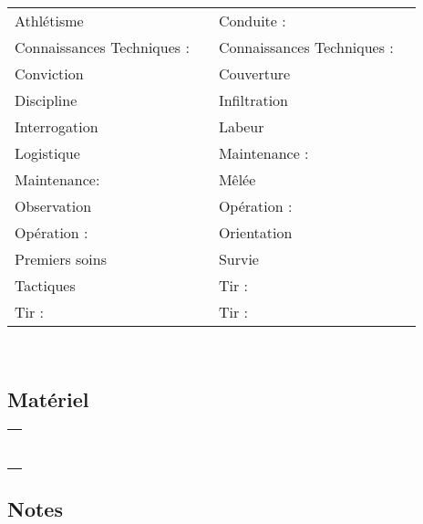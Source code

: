 \documentclass{report}
\begin{document}
\begin{tabular}{p{}| r || p{}| r|}
Athlétisme & &Conduite : & {}\\
Connaissances Techniques : &  &Connaissances Techniques : & {}\\
Conviction &  &Couverture& {}\\
Discipline &  &Infiltration& {}\\
Interrogation & & Labeur& {}\\
Logistique & & Maintenance : & {}\\
Maintenance: & & Mêlée& {}\\
Observation & & Opération : & {}\\
Opération : & & Orientation& {}\\
Premiers soins & & Survie& {}\\
Tactiques & & Tir : & {}\\
Tir : & & Tir : & {}\\

\end{tabular}\\
\noindent\makebox[\linewidth]{\rule{\textwidth}{0.4pt}}
\subsection*{Matériel}
\begin{tabular}{c}
     \\ \\ \\ \\ \\ \\ \\ \\
\end{tabular}

\noindent\makebox[\linewidth]{\rule{\textwidth}{0.4pt}}


\subsection*{Notes}
\end{document}
